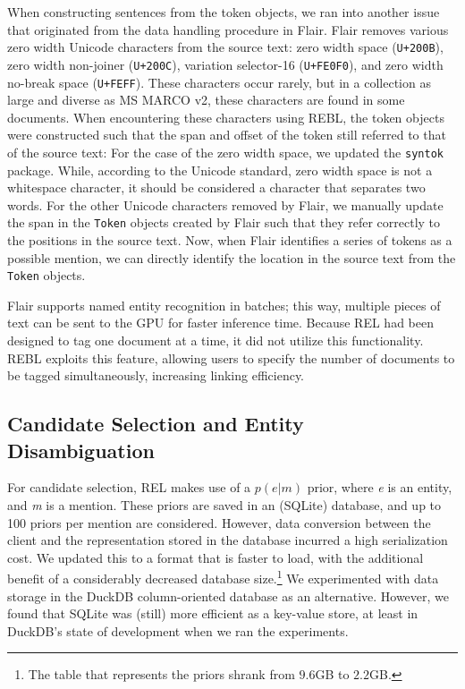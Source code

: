 When constructing sentences from the token objects, we ran into another issue that originated from the data handling procedure in Flair. Flair removes various zero width Unicode characters from the source text: zero width space (\texttt{U+200B}), zero width non-joiner (\texttt{U+200C}), variation selector-16 (\texttt{U+FE0F0}), and zero width no-break space (\texttt{U+FEFF}). These characters occur rarely, but in a collection as large and diverse as MS MARCO v2, these characters are found in some documents. When encountering these characters using REBL, the token objects were constructed such that the span and offset of the token still referred to that of the source text:
For the case of the zero width space, we updated the \texttt{syntok} package. While, according to the Unicode standard, zero width space is not a whitespace character, it should be considered a character that separates two words. For the other Unicode characters removed by Flair, we manually update the span in the \texttt{Token} objects created by Flair such that they refer correctly to the positions in the source text. Now, when Flair identifies a series of tokens as a possible mention, we can directly identify the location in the source text from the \texttt{Token} objects.

Flair supports named entity recognition in batches; this way, multiple pieces of text can be sent to the GPU for faster inference time. Because REL had been designed to tag one document at a time, it did not utilize this functionality. REBL exploits this feature, allowing users to specify the number of documents to be tagged simultaneously, increasing linking efficiency. 

\subsection{Candidate Selection and Entity Disambiguation}
For candidate selection, REL makes use of a $p(e|m)$ prior, where \textit{e} is an entity, and \textit{m} is a mention. These priors are saved in an (SQLite) database, and up to 100 priors per mention are considered. However, data conversion between the client and the representation stored in the database incurred a high serialization cost. We updated this to a format that is faster to load, with the additional benefit of a considerably decreased database size.\footnote{The table that represents the priors shrank from $9.6$GB to $2.2$GB.}
We experimented with data storage in the DuckDB column-oriented database as an alternative. However, we found that SQLite was (still) more efficient as a key-value store, at least in DuckDB's state of development when we ran the experiments.

